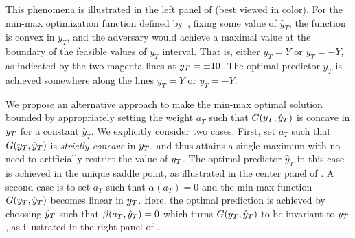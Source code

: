 This phenomena is illustrated in the left panel
of  (best viewed in color).  For the min-max optimization function defined
by~\cite{Forster}, fixing some value of $\hat{y}_{T}$, the function
is convex in $y_{T}$, and the adversary would achieve a maximal value
at the boundary of the feasible values of $y_{T}$ interval. That is,
either $y_{T}=Y$ or $y_{T}=-Y$, as indicated by the two magenta lines
at $y_{T}=\pm10$. The optimal predictor $\hat{y}_{T}$ is
achieved somewhere along the lines $y_{T}=Y$ or $y_{T}=-Y$.



We propose an alternative approach to make the min-max optimal solution
bounded by appropriately setting the weight $a_T$ such that
$G(y_{T},\hat{y}_{T})$ is concave in $y_{T}$ for a constant
$\hat{y}_{T}$. We explicitly consider two cases.
%
First, set $a_T$ such that $G(y_{T},\hat{y}_{T})$ is {\em strictly
  concave} in $y_{T}$, and thus attains a single maximum with no need
to artificially restrict the value of $y_{T}$. The optimal predictor
$\hat{y}_{T}$ in this case is achieved in the unique saddle point, as illustrated
in the center panel of .
%
A second case is to set $a_T$ such that $\alpha(a_T)=0$ and the
min-max function $G(y_{T},\hat{y}_{T})$ becomes linear in $y_{T}$. Here,
the optimal prediction is achieved by choosing $\hat{y}_{T}$ such that
$\beta(a_T, \hat{y}_{T})=0$ which turns $G(y_{T},\hat{y}_{T})$ to be
invariant to $y_{T}$, as illustrated in the right panel of
.  %

